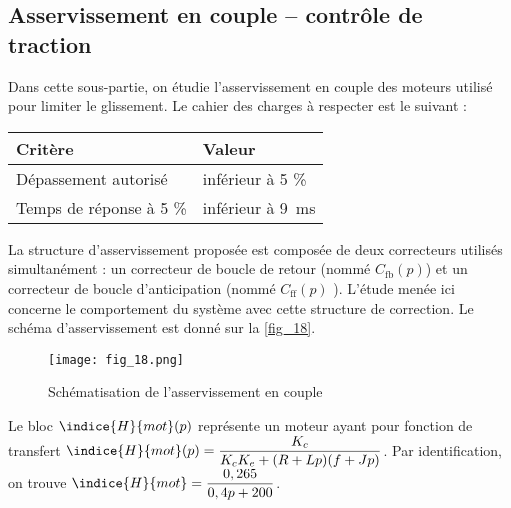 \subsection{Asservissement en couple – contrôle de traction}

\begin{obj}
Dans cette sous-partie, on étudie l’asservissement en couple des moteurs utilisé pour
limiter le glissement. Le cahier des charges à respecter est le suivant :

\begin{center}
\begin{tabular}{ll}
\hline
\textbf{Critère} & \textbf{Valeur} \\ \hline \hline
Dépassement autorisé & inférieur à 5 \% \\ \hline
Temps de réponse à 5 \% & inférieur à \SI{9}{ms} \\ \hline
\end{tabular}
\end{center}

\end{obj}


\ifprof
\else

La structure d’asservissement proposée est composée de deux correcteurs utilisés simultanément :
un correcteur de boucle de retour (nommé $C_{\text{fb}}( p)$) et un correcteur de boucle d'anticipation
(nommé $C_{\text{ff}}( p)$ ). L’étude menée ici concerne le comportement du système avec cette structure
de correction.
Le schéma d'asservissement est donné sur la \autoref{fig_18}.

\begin{figure}[H]
\centering
\texttt{[image: fig\_18.png]}
\caption{Schématisation de l'asservissement en couple \label{fig_18}}
\end{figure}


Le bloc  $\indice{H}{mot} (p)$ représente un moteur ayant pour fonction de transfert
$\indice{H}{mot} (p)=\dfrac{K_c}{K_c K_e+(R+Lp)( f +Jp)}$. Par identification, on trouve $\indice{H}{mot}= \dfrac{0,265}{0,4 p+200}$.
\fi


